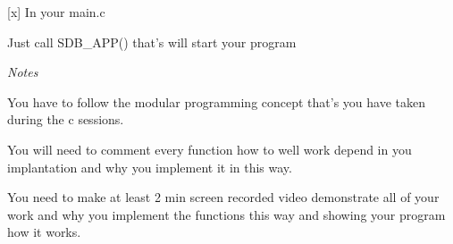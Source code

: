 \begin{DoxyItemize}
\begin{DoxyItemize}
\begin{DoxyItemize}
\begin{DoxyItemize}
\end{DoxyItemize}
\end{DoxyItemize}
\end{DoxyItemize}
\item \mbox{[}x\mbox{]} In your main.\+c
\begin{DoxyItemize}
\item Just call {\ttfamily SDB\+\_\+\+APP()} that’s will start your program
\item {\itshape Notes}
\begin{DoxyItemize}
\item You have to follow the modular programming concept that’s you have taken during the c sessions.
\item You will need to comment every function how to well work depend in you implantation and why you implement it in this way.
\item You need to make at least 2 min screen recorded video demonstrate all of your work and why you implement the functions this way and showing your program how it works. 
\end{DoxyItemize}
\end{DoxyItemize}
\end{DoxyItemize}